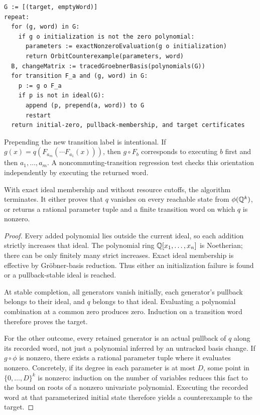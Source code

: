 \begin{lstlisting}
G := [(target, emptyWord)]
repeat:
  for (g, word) in G:
    if g o initialization is not the zero polynomial:
      parameters := exactNonzeroEvaluation(g o initialization)
      return OrbitCounterexample(parameters, word)
  B, changeMatrix := tracedGroebnerBasis(polynomials(G))
  for transition F_a and (g, word) in G:
    p := g o F_a
    if p is not in ideal(G):
      append (p, prepend(a, word)) to G
      restart
  return initial-zero, pullback-membership, and target certificates
\end{lstlisting}

Prepending the new transition label is intentional. If
$g(x)=q(F_{a_m}(\cdots F_{a_1}(x)))$, then $g\circ F_b$ corresponds to executing
$b$ first and then $a_1,\ldots,a_m$. A noncommuting-transition regression test
checks this orientation independently by executing the returned word.

\begin{theorem}\label{thm:ideal}
With exact ideal membership and without resource cutoffs, the algorithm
terminates. It either proves that $q$ vanishes on every reachable state from
$\phi(\mathbb{Q}^k)$, or returns a rational parameter tuple and a finite transition
word on which $q$ is nonzero.
\end{theorem}
\begin{proof}
Every added polynomial lies outside the current ideal, so each addition strictly
increases that ideal. The polynomial ring $\mathbb{Q}[x_1,\ldots,x_n]$ is Noetherian;
there can be only finitely many strict increases. Exact ideal membership is
effective by Gr\"obner-basis reduction. Thus either an initialization failure is
found or a pullback-stable ideal is reached.

At stable completion, all generators vanish initially, each generator's
pullback belongs to their ideal, and $q$ belongs to that ideal. Evaluating a
polynomial combination at a common zero produces zero. Induction on a transition
word therefore proves the target.

For the other outcome, every retained generator is an actual pullback of $q$
along its recorded word, not just a polynomial inferred by an untracked basis
change. If $g\circ\phi$ is nonzero, there exists a rational parameter tuple where
it evaluates nonzero. Concretely, if its degree in each parameter is at most
$D$, some point in $\{0,\ldots,D\}^k$ is nonzero: induction on the number of
variables reduces this fact to the bound on roots of a nonzero univariate
polynomial. Executing the recorded word at that parameterized initial state
therefore yields a counterexample to the target.
\end{proof}


